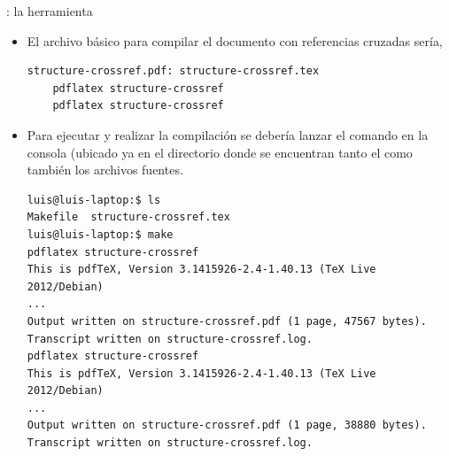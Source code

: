 \documentclass[draft]{beamer}
\begin{document}
\begin{frame}[fragile]{\insertsection: la herramienta }
  \begin{itemize}
    \item El archivo  básico para compilar el documento
      con referencias cruzadas sería,
    \begin{center}
      \begin{verbatim}
structure-crossref.pdf: structure-crossref.tex
	pdflatex structure-crossref
	pdflatex structure-crossref
      \end{verbatim}
    \end{center}
  \item Para ejecutar y realizar la compilación se debería lanzar el
    comando  en la consola (ubicado ya en el directorio
    donde se encuentran tanto el  como también los
    archivos fuentes.
    \begin{center}
      \begin{verbatim}
luis@luis-laptop:$ ls
Makefile  structure-crossref.tex
luis@luis-laptop:$ make
pdflatex structure-crossref
This is pdfTeX, Version 3.1415926-2.4-1.40.13 (TeX Live 2012/Debian)
...
Output written on structure-crossref.pdf (1 page, 47567 bytes).
Transcript written on structure-crossref.log.
pdflatex structure-crossref
This is pdfTeX, Version 3.1415926-2.4-1.40.13 (TeX Live 2012/Debian)
...
Output written on structure-crossref.pdf (1 page, 38880 bytes).
Transcript written on structure-crossref.log.
      \end{verbatim}
    \end{center}
  \end{itemize}
\end{frame}
\end{document}
